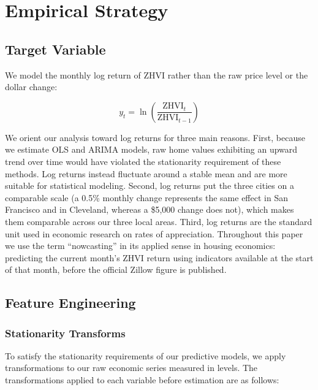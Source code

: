 \section{Empirical Strategy}
\label{sec:method}


\subsection{Target Variable}

We model the monthly log return of ZHVI rather than the raw price level or the dollar change:

$$y_t = \ln\!\left(\frac{\text{ZHVI}_t}{\text{ZHVI}_{t-1}}\right)$$

We orient our analysis toward log returns for three main reasons. First, because we estimate OLS and ARIMA models, raw home values exhibiting an upward trend over time would have violated the stationarity requirement of these methods. Log returns instead fluctuate around a stable mean and are more suitable for statistical modeling. Second, log returns put the three cities on a comparable scale (a 0.5\% monthly change represents the same effect in San Francisco and in Cleveland, whereas a \$5{,}000 change does not), which makes them comparable across our three local areas. Third, log returns are the standard unit used in economic research on rates of appreciation. Throughout this paper we use the term ``nowcasting'' in its applied sense in housing economics: predicting the current month's ZHVI return using indicators available at the start of that month, before the official Zillow figure is published.



\subsection{Feature Engineering}

\subsubsection{Stationarity Transforms}

To satisfy the stationarity requirements of our predictive models, we apply transformations to our raw economic series measured in levels. The transformations applied to each variable before estimation are as follows:


